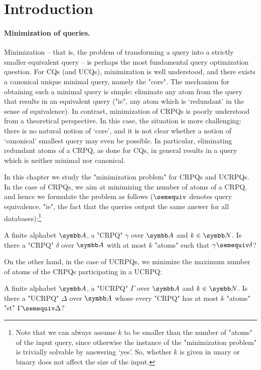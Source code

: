\section{Introduction}
\AP\label{sec:min-CRPQ-intro}
	

\paragraph{Minimization of queries.}
Minimization -- that is, the problem of transforming a query into a strictly smaller equivalent 
query -- is perhaps the most fundamental query optimization question.
For CQs (and UCQs), minimization is well understood, and there exists a canonical unique minimal query, namely the "core".
The mechanism for obtaining such a minimal query is simple: eliminate any atom from the query that results in an equivalent query ("ie", any atom which is `redundant'  in the sense of equivalence).
In contrast, minimization of CRPQs is poorly understood from a theoretical perspective. In this case, the situation is more challenging: there is no natural notion of `core’, and it is not clear whether a notion of `canonical’ smallest query may even be possible. In particular, eliminating redundant atoms of a CRPQ, as done for CQs, in general results in a query which is neither minimal nor canonical.

In this chapter we study the "minimization problem" for CRPQs and UCRPQs. In the case of CRPQs, we aim at minimizing the number of atoms of a CRPQ, and hence we formulate the problem as follows ($\semequiv$ denotes query equivalence, "ie", the fact that the queries output the same answer for all databases):\footnote{Note that we can always assume $k$ to be smaller than the number of "atoms" of the input query, since otherwise the instance of the "minimization problem" is trivially solvable by answering `yes'. So, whether $k$ is given in unary or binary does not affect the size of the input.}

{A finite alphabet $\A$, a "CRPQ" $\gamma$ over $\A$ and $k \in \N$.}
{Is there a "CRPQ" $\delta$ over $\A$ with at most $k$ "atoms" 
such that $\gamma \semequiv \delta$?}
\medskip

On the other hand, in the case of UCRPQs, we minimize the maximum number of atoms of the CRPQs participating in a UCRPQ:
	
{A finite alphabet $\A$, a "UCRPQ" $\Gamma$ over $\A$ and $k \in \N$.}
{Is there a "UCRPQ" $\Delta$ over $\A$ whose every "CRPQ" has at most $k$ "atoms" 
"st" $\Gamma \semequiv \Delta$?}
\medskip

